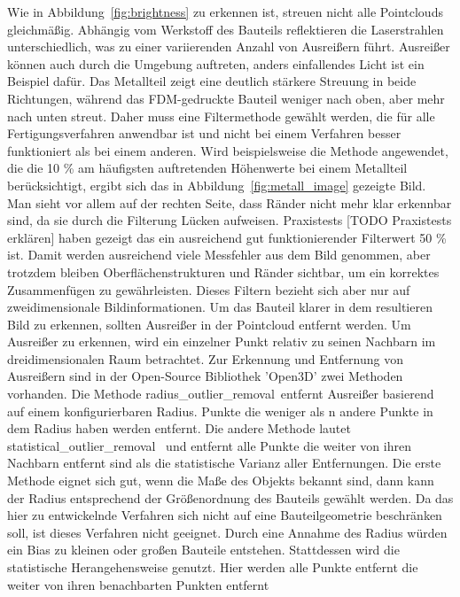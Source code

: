 Wie in Abbildung~\ref{fig:brightness} zu erkennen ist, streuen nicht alle Pointclouds
gleichmäßig. Abhängig vom Werkstoff des Bauteils reflektieren die Laserstrahlen 
unterschiedlich, was zu einer variierenden Anzahl von Ausreißern führt. Ausreißer können
auch durch die Umgebung auftreten, anders einfallendes Licht ist ein Beispiel dafür. 
Das Metallteil zeigt eine deutlich stärkere Streuung in beide Richtungen, 
während das FDM-gedruckte Bauteil weniger nach oben, 
aber mehr nach unten streut. Daher muss eine Filtermethode gewählt werden, 
die für alle Fertigungsverfahren anwendbar ist und nicht bei einem Verfahren 
besser funktioniert als bei einem anderen. Wird beispielsweise die Methode angewendet, 
die die 10 \% am häufigsten auftretenden Höhenwerte bei einem Metallteil berücksichtigt, 
ergibt sich das in Abbildung~\ref{fig:metall_image} gezeigte Bild.
Man sieht vor allem auf der rechten Seite, dass Ränder nicht mehr klar erkennbar sind, 
da sie durch die Filterung Lücken aufweisen. Praxistests [TODO Praxistests erklären] haben gezeigt das ein 
ausreichend gut funktionierender Filterwert 50 \% ist. Damit werden 
ausreichend viele Messfehler aus dem Bild genommen,
aber trotzdem bleiben Oberflächenstrukturen und Ränder
sichtbar, um ein korrektes Zusammenfügen zu gewährleisten.
Dieses Filtern bezieht sich aber nur auf zweidimensionale Bildinformationen.
Um das Bauteil klarer in dem resultieren Bild zu erkennen, sollten Ausreißer in 
der Pointcloud entfernt werden.
Um Ausreißer zu erkennen, wird ein einzelner Punkt relativ zu seinen Nachbarn
im dreidimensionalen Raum betrachtet.
Zur Erkennung und Entfernung von Ausreißern sind in der Open-Source
Bibliothek 'Open3D' zwei Methoden vorhanden. 
Die Methode \glqq radius\_outlier\_removal\grqq~entfernt Ausreißer basierend auf 
einem konfigurierbaren Radius. Punkte die weniger als n andere Punkte in dem Radius 
haben werden entfernt. Die andere Methode lautet 
\glqq statistical\_outlier\_removal\grqq~ 
und entfernt alle Punkte die weiter von ihren Nachbarn entfernt sind als die 
statistische Varianz aller Entfernungen.
Die erste Methode eignet sich gut, wenn die Maße des Objekts bekannt
sind, dann kann der Radius entsprechend der Größenordnung des Bauteils gewählt werden.
Da das hier zu entwickelnde Verfahren sich nicht auf eine Bauteilgeometrie 
beschränken soll, ist dieses Verfahren nicht geeignet. 
Durch eine Annahme des Radius würden ein Bias 
zu kleinen oder großen Bauteile entstehen.
Stattdessen wird die statistische Herangehensweise genutzt. 
Hier werden alle Punkte entfernt die weiter von ihren benachbarten Punkten entfernt
